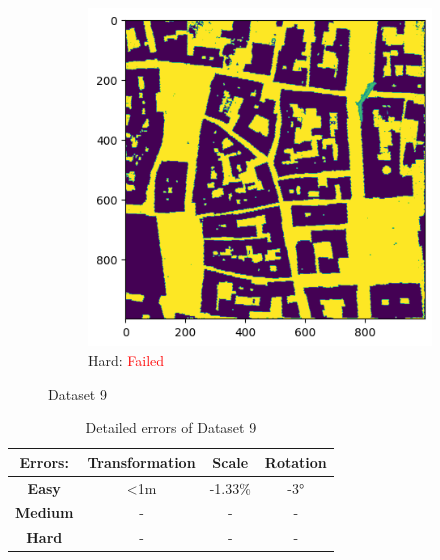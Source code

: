 \documentclass[11pt]{article}
\begin{document}
\begin{figure}[p]
        \vspace{1em}

        \begin{subfigure}{0.45\textwidth}
            \centering
            \includegraphics[width=\linewidth]{images/full/hard/5_6_1_hard}
            \caption{Hard: \textcolor{red}{Failed}}
            \label{fig:5_6_1_hard}
        \end{subfigure}
        \hfill

        \caption{Dataset 9}
        \label{fig:res_5_7_2}
    \end{figure}

    \begin{table}[p]
        \centering
        \begin{tabular}{|c|c|c|c|}
          \hline
          \textbf{Errors:} & \textbf{Transformation} & \textbf{Scale} & \textbf{Rotation} \\
          \hline
          \textbf{Easy}   & <1m  & -1.33\% & -3° \\
          \hline
          \textbf{Medium} & -  & - & - \\
          \hline
          \textbf{Hard}   & -  & - & - \\
          \hline
        \end{tabular}
        \caption{Detailed errors of Dataset 9}
        \label{tab:simpletable}
    \end{table}
\end{document}
